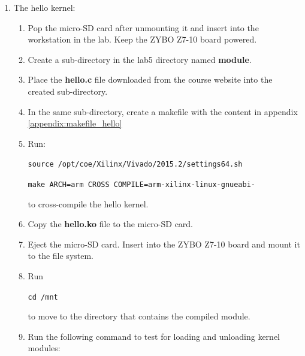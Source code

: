 \documentclass[11pt,letterpaper,titlepage]{article}
\begin{document}
\begin{enumerate}
\begin{enumerate}
    \end{enumerate}
    
    \newpage
    
    \item The hello kernel:
    
    \begin{enumerate}
        
        \item Pop the micro-SD card after unmounting it and insert into the workstation in the lab. Keep the ZYBO Z7-10 board powered.
        
        \item Create a sub-directory in the lab5 directory named \textbf{module}.
        
        \item Place the \textbf{hello.c} file downloaded from the course website into the created sub-directory.
        
        \item In the same sub-directory, create a makefile with the content in appendix \ref{appendix:makefile_hello}
        
        \item Run:
        
        \verb|source /opt/coe/Xilinx/Vivado/2015.2/settings64.sh|
        
        \verb|make ARCH=arm CROSS COMPILE=arm-xilinx-linux-gnueabi-|
        
        to cross-compile the hello kernel.
        
        \item Copy the \textbf{hello.ko} file to the micro-SD card.
        
        \item Eject the micro-SD card. Insert into the ZYBO Z7-10 board and mount it to the file system.
        
        \item Run
        
        \verb|cd /mnt|
        
        to move to the directory that contains the compiled module.
        
        \item Run the following command to test for loading and unloading kernel modules:
        

\end{enumerate}
\end{enumerate}
\end{document}
